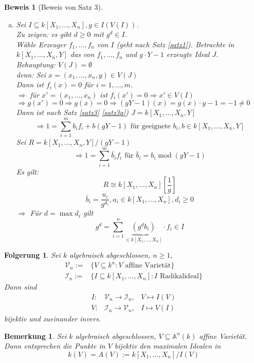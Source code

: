 \documentclass[a4paper,12pt]{report}
\theoremstyle{break}
\newtheorem{Bem}[Def]{Bemerkung}
\newtheorem{Folg}[Def]{Folgerung}
\theoremstyle{nonumberbreak}
\newtheorem{Bew}{Beweis}
\theoremstyle{nonumberplain}
\DeclareMathOperator{\modmodulo}{mod}%
\newcommand{\A}{\mathbb{A}}
\begin{document}
\begin{Bew}[Beweis von Satz 3]
\begin{enumerate}[a)]
\item
Sei $I\subseteq k[X_1,\dots ,X_n], g\in I(V(I))$.\\
\emph{Zu zeigen:}  es gibt $d\geq 0$ mit $g^d\in I$.\\
W\"ahle Erzeuger $f_1,\dots , f_n$ von $I$ (geht nach Satz \ref{satz1}).
Betrachte in $k[X_1,\dots ,X_n,Y]$ das von $f_1,\dots ,f_n$ und $g\cdot Y-1$ erzeugte Ideal $J$.\\
\emph{Behauptung:} $V(J) = \emptyset$\\
\emph{denn:} Sei $x= (x_1,\dots ,x_n, y) \in V(J)$\\
Dann ist $f_i(x)= 0$ f\"ur $i=1,\dots ,m$.\\
$\Rightarrow $ f\"ur $x'=(x_1,\dots ,x_n)$ ist $f_i(x')=0 \Rightarrow x'\in V(I)$\\
$\Rightarrow g(x')=0 \Rightarrow g(x)=0\Rightarrow (gY-1)(x)=g(x)\cdot y-1 = -1 \not=0$\\
Dann ist nach Satz \ref{satz3} \ref{satz3a}) $J=k[X_1,\dots ,X_n,Y]$
\[\Rightarrow 1= \sum_{i=1}^m b_i f_i + b(gY-1) \textrm{ f\"ur geeignete }b_i, b\in k[X_1,\dots ,X_n,Y]\]
Sei $R =k[X_1,\dots ,X_n,Y]/(gY-1)$
\[\Rightarrow 1=\sum_{i=1}^m \bar{b}_if_i \textrm{ f\"ur }\bar{b}_i = b_i \modmodulo(gY-1)\]
\emph{Es gilt:} \[R\cong k[X_1,\dots ,X_n][\frac{1}{g}]\]
\[\bar b_i= \frac{u_i}{g^{d_i}}, a_i\in k[X_1,\dots ,X_n], d_i \geq0\]
$\Rightarrow$ F\"ur $d= \max d_i$ gilt
	\[g^d = \sum_{i=1}^n \underbrace{\left( g^d b_i \right)}_{\in k[X_1,\dots ,X_n]} \cdot f_i \in I\]
\end{enumerate}\end{Bew}

\begin{Folg}
Sei $k$ algebraisch abgeschlossen, $n\geq 1$,
	\[\begin{array}{rl}\mathcal{V}_n := & \{V\subseteq k^n : V \textrm{ affine Variet\"at}\}\\
	\mathcal{I}_n := & \{ I\subseteq k[X_1,\dots ,X_n] : I \textrm{ Radikalideal}\} \end{array}\]
Dann sind \[\begin{array}{rll}
	I: & \mathcal{V}_n \to \mathcal{I}_n, & V \mapsto I(V)\\
	V: & \mathcal{I}_n \to \mathcal{V}_n, & I \mapsto V(I)\end{array}\]
bijektiv und zueinander invers.
\end{Folg}

\begin{Bem}
Sei $k$ algebraisch abgeschlossen, $V\subseteq \A ^n(k)$ affine Variet\"at.\\
Dann entsprechen die Punkte in $V$ bijektiv den maximalen Idealen in \[
	k(V) =A(V):= k[X_1,\dots ,X_n]/I(V) \]
\end{Bem}
\end{document}
